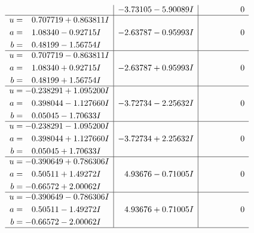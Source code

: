 \documentclass[1p]{elsarticle_modified}
\theoremstyle{definition}
\begin{document}
$$\begin{array}{c|c|c}
 & -3.73105 - 5.90089 I & \phantom{-0.000000 } 0 \\ \hline\begin{aligned}
u &= \phantom{-}0.707719 + 0.863811 I \\
a &= \phantom{-}1.08340 - 0.92715 I \\
b &= \phantom{-}0.48199 - 1.56754 I\end{aligned}
 & -2.63787 - 0.95993 I & \phantom{-0.000000 } 0 \\ \hline\begin{aligned}
u &= \phantom{-}0.707719 - 0.863811 I \\
a &= \phantom{-}1.08340 + 0.92715 I \\
b &= \phantom{-}0.48199 + 1.56754 I\end{aligned}
 & -2.63787 + 0.95993 I & \phantom{-0.000000 } 0 \\ \hline\begin{aligned}
u &= -0.238291 + 1.095200 I \\
a &= \phantom{-}0.398044 - 1.127660 I \\
b &= \phantom{-}0.05045 - 1.70633 I\end{aligned}
 & -3.72734 - 2.25632 I & \phantom{-0.000000 } 0 \\ \hline\begin{aligned}
u &= -0.238291 - 1.095200 I \\
a &= \phantom{-}0.398044 + 1.127660 I \\
b &= \phantom{-}0.05045 + 1.70633 I\end{aligned}
 & -3.72734 + 2.25632 I & \phantom{-0.000000 } 0 \\ \hline\begin{aligned}
u &= -0.390649 + 0.786306 I \\
a &= \phantom{-}0.50511 + 1.49272 I \\
b &= -0.66572 + 2.00062 I\end{aligned}
 & \phantom{-}4.93676 - 0.71005 I & \phantom{-0.000000 } 0 \\ \hline\begin{aligned}
u &= -0.390649 - 0.786306 I \\
a &= \phantom{-}0.50511 - 1.49272 I \\
b &= -0.66572 - 2.00062 I\end{aligned}
 & \phantom{-}4.93676 + 0.71005 I & \phantom{-0.000000 } 0\\
 \hline 
 \end{array}$$\newpage$$\begin{array}{c|c|c}  

\end{array}$$
\end{document}
